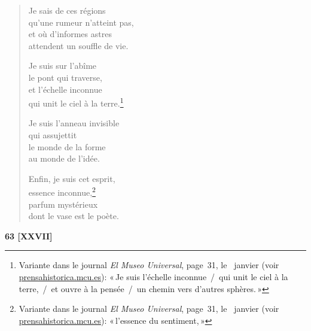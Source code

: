 \begin{verse}
  Je sais de ces régions \\
  qu'une rumeur n'atteint pas, \\
  et où d'informes astres \\
  attendent un souffle de vie.

  Je suis sur l'abîme \\
  le pont qui traverse, \\
  et l'échelle inconnue \\
  qui unit le ciel à la terre.\footnote{Variante dans le journal
  \emph{El Museo Universal}, page~31, le~ janvier  (voir
  \url{prensahistorica.mcu.es}): «\,Je suis l'échelle inconnue~/~qui unit
  le ciel à la terre,~/~et ouvre à la pensée~/~un chemin vers d'autres
  sphères.\,»}

  Je suis l'anneau invisible \\
  qui assujettit \\
  le monde de la forme \\
  au monde de l'idée.

  Enfin, je suis cet esprit, \\
  essence inconnue,\footnote{Variante dans le journal
  \emph{El Museo Universal}, page~31, le~ janvier  (voir
  \url{prensahistorica.mcu.es}): «\,l'essence du sentiment,\,»} \\
  parfum mystérieux \\
  dont le vase est le poète.
\end{verse}


\begin{center}
  \textbf{63 [XXVII]}
\end{center}

